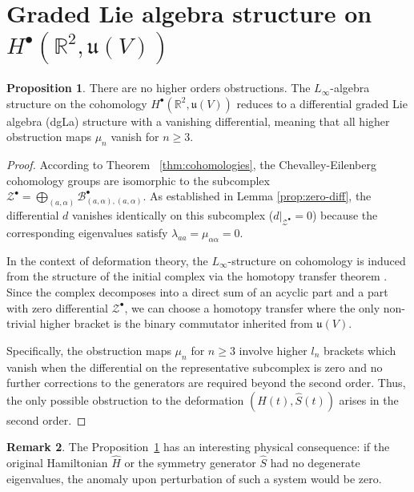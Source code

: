 \documentclass[10pt,a4paper]{amsart}
\theoremstyle{definition}
\newtheorem{remark}{Remark}[section]
\newtheorem{proposition}[remark]{Proposition}
\begin{document}
\section{Graded Lie algebra structure on $H^{\bullet}(\mathbb{R}^{2},\mathfrak{u}(V))$}
\begin{proposition}
    \label{lemma:no_obs}
    There are no higher orders obstructions. The $L_{\infty}$-algebra structure on the cohomology $H^{\bullet}(\mathbb{R}^{2}, \mathfrak{u}(V))$ reduces to a differential graded Lie algebra (dgLa) structure with a vanishing differential, meaning that all higher obstruction maps $\mu_{n}$ vanish for $n \geq 3$.
    \begin{proof}
    According to Theorem ~\ref{thm:cohomologies}, the Chevalley-Eilenberg cohomology groups are isomorphic to the subcomplex $\mathcal{Z}^{\bullet} = \bigoplus_{(a, \alpha)} \mathcal{B}_{(a, \alpha), (a, \alpha)}^{\bullet}$. As established in Lemma \ref{prop:zero-diff}, the differential $d$ vanishes identically on this subcomplex ($d|_{\mathcal{Z}^{\bullet}} = 0$) because the corresponding eigenvalues satisfy $\lambda_{aa} = \mu_{\alpha\alpha} = 0$.
    
    In the context of deformation theory, the $L_{\infty}$-structure on cohomology is induced from the structure of the initial complex via the homotopy transfer theorem \cite{Arvanitakis:2020homotopy}. Since the complex decomposes into a direct sum of an acyclic part and a part with zero differential $\mathcal{Z}^{\bullet}$, we can choose a homotopy transfer where the only non-trivial higher bracket is the binary commutator inherited from $\mathfrak{u}(V)$. 
    
    Specifically, the obstruction maps $\mu_n$ for $n \geq 3$ involve higher $l_n$ brackets which vanish when the differential on the representative subcomplex is zero and no further corrections to the generators are required beyond the second order. Thus, the only possible obstruction to the deformation $(\hat{H}(t), \hat{S}(t))$ arises in the second order.
    \end{proof}
\end{proposition}
\begin{remark}
The Proposition~\ref{lemma:no_obs} has an interesting physical consequence: if the original Hamiltonian $\hat{H}$ or the symmetry generator $\hat{S}$ had no degenerate eigenvalues, the anomaly upon perturbation of such a system would be zero.
\end{remark}
\end{document}
